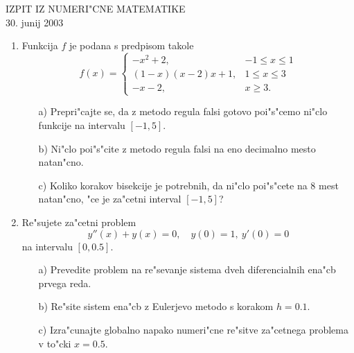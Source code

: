 
\begin{center}
  IZPIT IZ NUMERI"CNE MATEMATIKE\\
  30. junij 2003
\end{center}
\vspace{1cm}

\begin{enumerate}

  \item Funkcija $f$ je podana s predpisom takole
  $$f(x)=
  \left\{
  \begin{array}{rl}
    -x^2+2, & -1\leq x\leq 1\\
    (1-x)(x-2)x+1,&1\leq x\leq 3\\
    -x-2, & x\geq 3.
  \end{array}
  \right.
  $$  

  \begin{itemize}
    \item[a)] Prepri"cajte se, da z metodo regula falsi gotovo
    poi"s"cemo ni"clo funkcije na intervalu $[-1,5]$.
    \item[b)] Ni"clo poi"s"cite z metodo regula falsi na eno 
    decimalno mesto natan\-"cno.
    \item[c)] Koliko korakov bisekcije je potrebnih, da ni"clo poi"s"cete
    na 8 mest natan"cno, "ce je za"cetni interval $[-1,5]$?
  \end{itemize}
 
  \item Re"sujete za"cetni problem
  $$y''(x)+y(x)=0,\quad y(0)=1,\ y'(0)=0$$
  na intervalu $[0,0.5]$.

    \begin{itemize}
      \item[a)] Prevedite problem na re"sevanje sistema dveh 
      diferencialnih ena"cb prvega reda.

      \item[b)] Re"site sistem ena"cb z Eulerjevo metodo s korakom $h=0.1$.

      \item[c)] Izra"cunajte globalno napako numeri"cne re"sitve za"cetnega 
      problema v to"cki $x=0.5$.

     \end{itemize}
\end{enumerate}
   




